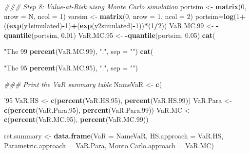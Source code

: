 \documentclass[]{article}
\newenvironment{Shaded}{\begin{snugshade}}{\end{snugshade}}
\newcommand{\CommentTok}[1]{\textcolor[rgb]{0.56,0.35,0.01}{\textit{#1}}}
\newcommand{\DataTypeTok}[1]{\textcolor[rgb]{0.13,0.29,0.53}{#1}}
\newcommand{\DecValTok}[1]{\textcolor[rgb]{0.00,0.00,0.81}{#1}}
\newcommand{\FloatTok}[1]{\textcolor[rgb]{0.00,0.00,0.81}{#1}}
\newcommand{\KeywordTok}[1]{\textcolor[rgb]{0.13,0.29,0.53}{\textbf{#1}}}
\newcommand{\NormalTok}[1]{#1}
\newcommand{\OperatorTok}[1]{\textcolor[rgb]{0.81,0.36,0.00}{\textbf{#1}}}
\newcommand{\StringTok}[1]{\textcolor[rgb]{0.31,0.60,0.02}{#1}}
\begin{document}
\begin{Shaded}
\begin{Highlighting}[]
{{{{{{{{{{{\CommentTok{### Step 8: Value-at-Risk uisng Monte Carlo simulation}
\NormalTok{portsim <-}\StringTok{ }\KeywordTok{matrix}\NormalTok{(}\DecValTok{0}\NormalTok{, }\DataTypeTok{nrow =}\NormalTok{ N, }\DataTypeTok{ncol =} \DecValTok{1}\NormalTok{)}
\NormalTok{varsim <-}\StringTok{ }\KeywordTok{matrix}\NormalTok{(}\DecValTok{0}\NormalTok{, }\DataTypeTok{nrow =} \DecValTok{1}\NormalTok{, }\DataTypeTok{ncol =} \DecValTok{2}\NormalTok{)}
\NormalTok{portsim=}\KeywordTok{log}\NormalTok{(}\DecValTok{1}\OperatorTok{+}\NormalTok{((}\KeywordTok{exp}\NormalTok{(y1simulated)}\OperatorTok{-}\DecValTok{1}\NormalTok{)}\OperatorTok{+}\NormalTok{(}\KeywordTok{exp}\NormalTok{(y2simulated)}\OperatorTok{-}\DecValTok{1}\NormalTok{))}\OperatorTok{*}\NormalTok{(}\DecValTok{1}\OperatorTok{/}\DecValTok{2}\NormalTok{))}
\NormalTok{VaR.MC}\FloatTok{.99}\NormalTok{ <-}\StringTok{ }\OperatorTok{-}\KeywordTok{quantile}\NormalTok{(portsim, }\FloatTok{0.01}\NormalTok{)}
\NormalTok{VaR.MC}\FloatTok{.95}\NormalTok{ <-}\StringTok{ }\OperatorTok{-}\KeywordTok{quantile}\NormalTok{(portsim, }\FloatTok{0.05}\NormalTok{)}
\KeywordTok{cat}\NormalTok{(}\StringTok{"The 99%
    \KeywordTok{percent}\NormalTok{(VaR.MC}\FloatTok{.99}\NormalTok{), }\StringTok{"."}\NormalTok{, }\DataTypeTok{sep =} \StringTok{""}\NormalTok{)}
\KeywordTok{cat}\NormalTok{(}\StringTok{"The 95%
    \KeywordTok{percent}\NormalTok{(VaR.MC}\FloatTok{.95}\NormalTok{), }\StringTok{"."}\NormalTok{, }\DataTypeTok{sep =} \StringTok{""}\NormalTok{)}

\CommentTok{### Print the VaR summary table}
\NormalTok{NameVaR <-}\StringTok{ }\KeywordTok{c}\NormalTok{(}\StringTok{'95%
\NormalTok{VaR.HS <-}\StringTok{ }\KeywordTok{c}\NormalTok{(}\KeywordTok{percent}\NormalTok{(VaR.HS}\FloatTok{.95}\NormalTok{), }\KeywordTok{percent}\NormalTok{(VaR.HS}\FloatTok{.99}\NormalTok{))}
\NormalTok{VaR.Para <-}\StringTok{ }\KeywordTok{c}\NormalTok{(}\KeywordTok{percent}\NormalTok{(VaR.Para}\FloatTok{.95}\NormalTok{), }\KeywordTok{percent}\NormalTok{(VaR.Para}\FloatTok{.99}\NormalTok{))}
\NormalTok{VaR.MC <-}\StringTok{ }\KeywordTok{c}\NormalTok{(}\KeywordTok{percent}\NormalTok{(VaR.MC}\FloatTok{.95}\NormalTok{), }\KeywordTok{percent}\NormalTok{(VaR.MC}\FloatTok{.99}\NormalTok{))}


\NormalTok{ret.summary <-}\StringTok{ }\KeywordTok{data.frame}\NormalTok{(}\DataTypeTok{VaR =}\NormalTok{ NameVaR, }\DataTypeTok{HS.approach =}\NormalTok{ VaR.HS,}
                          \DataTypeTok{Parametric.approach =}\NormalTok{ VaR.Para, }\DataTypeTok{Monto.Carlo.approach =}\NormalTok{ VaR.MC)}

}}}}}}}}}}}}}}
\end{Highlighting}
\end{Shaded}
\end{document}

